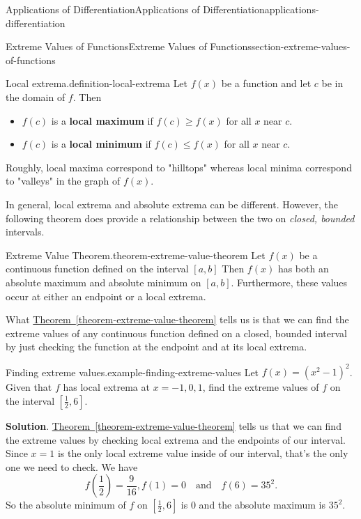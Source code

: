 \documentclass[oneside,10pt,]{book}
\newcommand{\terminology}[1]{\textbf{#1}}
\numberwithin{equation}{section}
\begin{document}
\begin{chapterptx}{Applications of Differentiation}{}{Applications of Differentiation}{}{}{applications-differentiation}
\begin{sectionptx}{Extreme Values of Functions}{}{Extreme Values of Functions}{}{}{section-extreme-values-of-functions}
\begin{definition}{Local extrema.}{definition-local-extrema}
\hypertarget{p-313}{}%
Let \(f(x)\) be a function and let \(c\) be in the domain of \(f\). Then\leavevmode%
\begin{itemize}[label=\textbullet]
\item{}\(f(c)\) is a \terminology{local maximum} if \(f(c)\geq f(x)\) for all \(x\) near \(c\).%
\item{}\(f(c)\) is a \terminology{local minimum} if \(f(c)\leq f(x)\) for all \(x\) near \(c\).%
\end{itemize}
Roughly, local maxima correspond to "hilltops" whereas local minima correspond to "valleys" in the graph of \(f(x)\).%
\end{definition}
\hypertarget{p-314}{}%
In general, local extrema and absolute extrema can be different. However, the following theorem does provide a relationship between the two on \emph{closed, bounded} intervals.%
\begin{theorem}{Extreme Value Theorem.}{}{theorem-extreme-value-theorem}%
\hypertarget{p-315}{}%
Let \(f(x)\) be a continuous function defined on the interval \([a,b]\) Then \(f(x)\) has both an absolute maximum and absolute minimum on \([a,b]\). Furthermore, these values occur at either an endpoint or a local extrema.%
\end{theorem}
\hypertarget{p-316}{}%
What \hyperref[theorem-extreme-value-theorem]{Theorem~\ref{theorem-extreme-value-theorem}} tells us is that we can find the extreme values of any continuous function defined on a closed, bounded interval by just checking the function at the endpoint and at its local extrema.%
\begin{example}{Finding extreme values.}{example-finding-extreme-values}%
\hypertarget{p-317}{}%
Let \(f(x) = (x^{2}-1)^{2}\). Given that \(f\) has local extrema at \(x=-1,0,1\), find the extreme values of \(f\) on the interval \([\frac{1}{2},6]\).%
\par\smallskip%
\noindent\textbf{Solution}.\hypertarget{solution-70}{}\quad%
\hypertarget{p-318}{}%
\hyperref[theorem-extreme-value-theorem]{Theorem~\ref{theorem-extreme-value-theorem}} tells us that we can find the extreme values by checking local extrema and the endpoints of our interval. Since \(x=1\) is the only local extreme value inside of our interval, that's the only one we need to check. We have%
\begin{equation*}
f(\frac{1}{2}) = \frac{9}{16}, f(1) = 0\quad\text{and}\quad f(6) = 35^{2}.
\end{equation*}
So the absolute minimum of \(f\) on \([\frac{1}{2},6]\) is \(0\) and the absolute maximum is \(35^{2}.\)%

\end{example}
\end{sectionptx}
\end{chapterptx}
\end{document}
